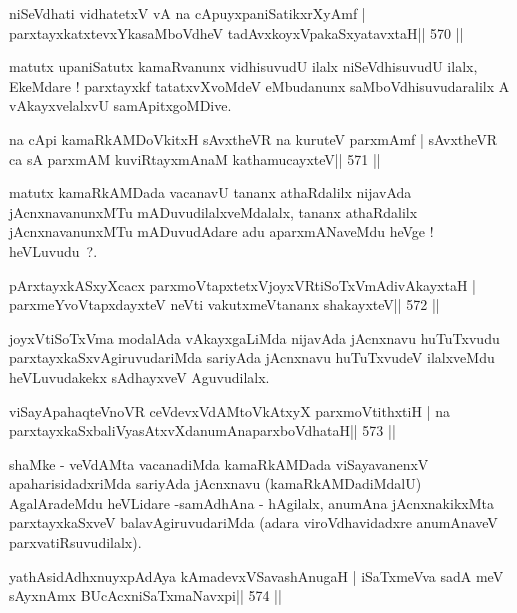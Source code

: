 \begin{shl}
niSeVdhati vidhatetxV vA na cApuyxpaniSatikxrXyAmf |
parxtayxkatxtevxYkasaMboVdheV tadAvxkoyxVpakaSxyatavxtaH\hfill || 570 ||
\end{shl}

\begin{artha}
matutx upaniSatutx kamaRvanunx vidhisuvudU ilalx niSeVdhisuvudU ilalx, EkeMdare ! parxtayxkf tatatxvXvoMdeV eMbudanunx saMboVdhisuvudaralilx A vAkayxvelalxvU samApitxgoMDive.
\end{artha}

\begin{shl}
na cApi kamaRkAMDoVkitxH sAvxtheVR na kuruteV parxmAmf |
sAvxtheVR ca sA parxmAM kuviRtayxmAnaM kathamucayxteV\hfill || 571 ||
\end{shl}

\begin{artha}
matutx kamaRkAMDada vacanavU tananx athaRdalilx nijavAda jAcnxnavanunxMTu mADuvudilalxveMdalalx, tananx athaRdalilx jAcnxnavanunxMTu mADuvudAdare adu aparxmANaveMdu heVge ! heVLuvudu~?.
\end{artha}

\begin{shl}
pArxtayxkASxyXcacx parxmoVtapxtetxVjoyxVRtiSoTxVmAdivAkayxtaH |
parxmeYvoVtapxdayxteV neVti vakutxmeVtananx shakayxteV\hfill || 572 ||
\end{shl}

\begin{artha}
joyxVtiSoTxVma modalAda vAkayxgaLiMda nijavAda jAcnxnavu huTuTxvudu parxtayxkaSxvAgiruvudariMda sariyAda jAcnxnavu huTuTxvudeV ilalxveMdu heVLuvudakekx sAdhayxveV Aguvudilalx.
\end{artha}

\begin{shl}
viSayApahaqteVnoVR ceVdevxVdAMtoVkAtxyX parxmoVtithxtiH |
na parxtayxkaSxbaliVyasAtxvXdanumAnaparxboVdhataH\hfill || 573 ||
\end{shl}

\begin{artha}
shaMke - veVdAMta vacanadiMda kamaRkAMDada viSayavanenxV apaharisidadxriMda sariyAda jAcnxnavu (kamaRkAMDadiMdalU) AgalAradeMdu heVLidare -\break samAdhAna - hAgilalx, anumAna jAcnxnakikxMta parxtayxkaSxveV balavAgiruvudariMda (adara viroVdhavidadxre anumAnaveV parxvatiRsuvudilalx).
\end{artha}



\begin{shl}
yathAsidAdhxnuyxpAdAya kAmadevxVSavashAnugaH |
iSaTxmeVva sadA meV sAyxnAmx BUcAcxniSaTxmaNavxpi\hfill || 574 ||
\end{shl}

